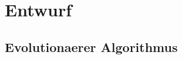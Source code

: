 
\chapter{Entwurf}
\label{ch:Entwurf}




\section{Evolutionaerer Algorithmus}
\label{ch:Entwurf:sec:Evolutionaerer Algorithmus}









